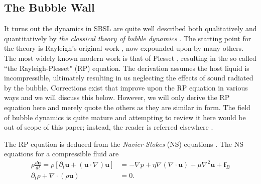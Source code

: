 \documentclass[prb,aps,nofootinbib,superscriptaddress,floatfix]{revtex4-2}
\begin{document}
\subsection{The Bubble Wall}
It turns out the dynamics in SBSL are quite well described both qualitatively and quantitatively by \emph{the classical theory of bubble dynamics} \cite{prosperetti1999old,brenner2002single,prosperetti1986bubble,plesset1977bubble,suslick2008inside,yasui2018acoustic,brennen2014cavitation}. The starting point for the theory is Rayleigh's original work \cite{rayleigh1917pressure}, now expounded upon by many others. The most widely known modern work is that of Plesset \cite{plesset1977bubble,plesset1949dynamics,prosperetti1986bubble}, resulting in the so called ``the Rayleigh-Plesset" (RP) equation. The derivation assumes the host liquid is incompressible, ultimately resulting in us neglecting the effects of sound radiated by the bubble. Corrections exist that improve upon the RP equation in various ways and we will discuss this below. However, we will only derive the RP equation here and merely quote the others as they are similar in form. The field of bubble dynamics is quite mature and attempting to review it here would be out of scope of this paper; instead, the reader is referred elsewhere \cite{prosperetti1999old,brenner2002single,yasui2018acoustic,prosperetti1986bubble}. 

The RP equation is deduced from the \emph{Navier-Stokes} (NS) equations \cite{prosperetti1999old,brenner2002single,prosperetti1986bubble,plesset1977bubble,suslick2008inside,yasui2018acoustic}. The NS equations for a compressible fluid are
\begin{equation}
\begin{split}
    \rho \frac{d \bm{u}}{dt} = \rho \left[ \partial_t \bm{u}+\left(\bm{u}\cdot \nabla \right)\bm{u} \right] & =-\nabla p + \eta \nabla \left(\nabla \cdot \bm{u} \right)+\mu \nabla^2 \bm{u} + \bm{f}_B \\ 
     \partial_t \rho+\nabla\cdot(\rho \bm{u}) & = 0.
     \label{eq:NS_equations}
\end{split}
\end{equation}
\end{document}

